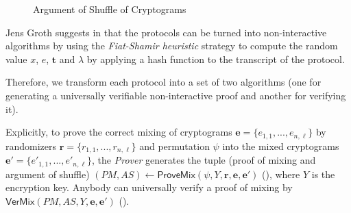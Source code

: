 \begin{figure}[ht]
    \caption{Argument of Shuffle of Cryptograms}
    \label{fig: argument of shuffle of cryptograms protocol}
\end{figure}

Jens Groth suggests in \cite{Groth05} that the protocols can be turned into non-interactive algorithms by using the \textit{Fiat-Shamir heuristic} strategy \cite{Fiat87} to compute the random value $x$, $e$, $\boldsymbol{t}$ and $\lambda$ by applying a hash function to the transcript of the protocol.

Therefore, we transform each protocol into a set of two algorithms (one for generating a universally verifiable non-interactive proof and another for verifying it).

Explicitly, to prove the correct mixing of cryptograms $\boldsymbol{e} = \{e_{1,1}, ..., e_{n,\ell}\}$ by randomizers $\boldsymbol{r} = \{r_{1,1}, ..., r_{n,\ell}\}$ and permutation $\psi$ into the mixed cryptograms $\boldsymbol{e'} = \{e'_{1,1}, ..., e'_{n,\ell}\}$, the \textit{Prover} generates the tuple (proof of mixing and argument of shuffle) $(PM, AS) \gets \mathsf{ProveMix}(\psi, Y, \boldsymbol{r}, \boldsymbol{e}, \boldsymbol{e'})$ (), where $Y$ is the encryption key. Anybody can universally verify a proof of mixing by $\mathsf{VerMix}(PM, AS, Y, \boldsymbol{e}, \boldsymbol{e'})$ ().

